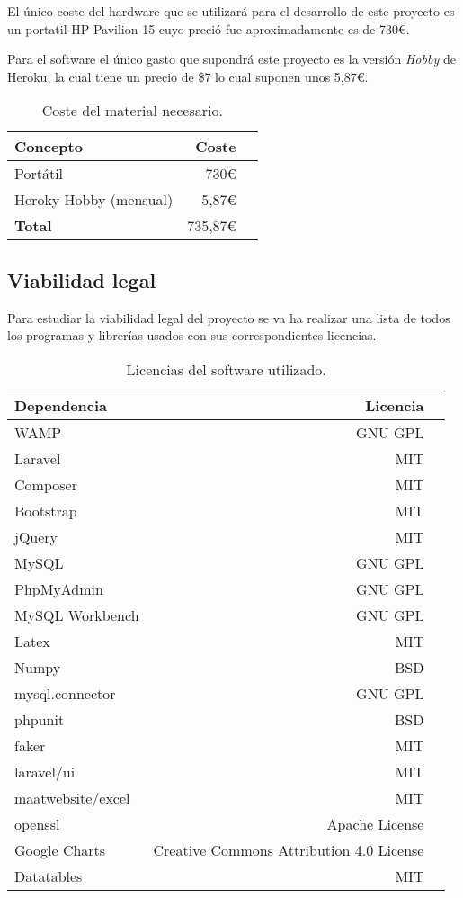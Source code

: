 El único coste del hardware que se utilizará para el desarrollo de este proyecto es un portatil HP Pavilion 15 cuyo preció fue aproximadamente es de 730€.

Para el software el único gasto que supondrá este proyecto es la versión \textit{Hobby} de Heroku, la cual tiene un precio de \$7 lo cual suponen unos 5,87€.

\begin{table}[H]
	 \begin{tabularx}{\linewidth}{X r r}
	 	\toprule \textbf{Concepto} & \textbf{Coste} \\
	 	\toprule
        Portátil &  730€\\
        Heroky Hobby (mensual) & 5,87€ \\
        \midrule
	    \textbf{Total} & 735,87€  \\
	 	\bottomrule
	 \end{tabularx}
	 \caption{Coste del material necesario.}
\end{table}

\subsection{Viabilidad legal}

Para estudiar la viabilidad legal del proyecto se va ha realizar una lista de todos los programas y librerías usados con sus correspondientes licencias.

\begin{table}[H]
	 \begin{tabularx}{\linewidth}{X r r}
	 	\toprule \textbf{Dependencia} & \textbf{Licencia} \\
	 	\toprule
        WAMP &  GNU GPL\\
        Laravel & MIT   \\
        Composer & MIT   \\
        Bootstrap & MIT   \\
        jQuery & MIT   \\
        MySQL & GNU GPL \\
        PhpMyAdmin & GNU GPL  \\
        MySQL Workbench & GNU GPL  \\
        Latex & MIT   \\
        Numpy & BSD   \\
        mysql.connector & GNU GPL \\
        phpunit & BSD  \\
        faker & MIT   \\
        laravel/ui & MIT   \\
        maatwebsite/excel & MIT   \\
        openssl & Apache License   \\
        Google Charts & Creative Commons Attribution 4.0 License   \\
        Datatables & MIT   \\
        \midrule
	 \end{tabularx}
	 \caption{Licencias del software utilizado.}
	 \label{table:licencias}
\end{table} 

